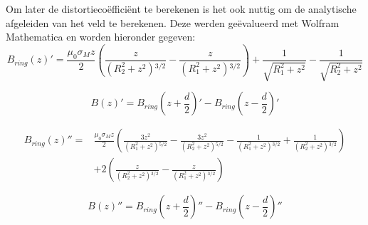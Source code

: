 \documentclass[we,twoside,openright,a4paper,11pt]{uantwerpenbamathesis}
\begin{document}

Om later de distortiecoëfficiënt te berekenen is het ook nuttig om de analytische afgeleiden van het veld te berekenen. Deze werden geëvalueerd met Wolfram Mathematica en worden hieronder gegeven:
\begin{equation}
    B_{ring}(z)'= \frac{\mu_0\sigma_Mz}{2} \left(\frac{z}{\left(R_2^2+z^2\right){}^{3/2}}-\frac{z}{\left(R_1^2+z^2\right){}^{3/2}}\right)+\frac{1}{\sqrt{R_1^2+z^2}}-\frac{1}{\sqrt{R_2^2+z^2}}
\end{equation}

\begin{equation}
    B(z)'= B_{ring}\left(z+\frac{d}{2}\right)' - B_{ring}\left(z-\frac{d}{2}\right)'
\end{equation}

\begin{equation}
\begin{split}
    B_{ring}(z)''= & \frac{\mu_0\sigma_Mz}{2} \left(\frac{3 z^2}{\left(R_1^2+z^2\right){}^{5/2}}-\frac{3 z^2}{\left(R_2^2+z^2\right){}^{5/2}}-\frac{1}{\left(R_1^2+z^2\right){}^{3/2}}+\frac{1}{\left(R_2^2+z^2\right){}^{3/2}}\right)\\
    &+2 \left(\frac{z}{\left(R_2^2+z^2\right){}^{3/2}}-\frac{z}{\left(R_1^2+z^2\right){}^{3/2}}\right)
\end{split}
\end{equation}

\begin{equation}
   B(z)''= B_{ring}\left(z+\frac{d}{2}\right)'' - B_{ring}\left(z-\frac{d}{2}\right)''
\end{equation}
\end{document}
